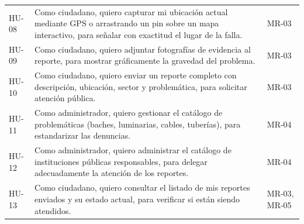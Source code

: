 \begin{table}[!htbp]
\begin{tabularx}{\textwidth}{p{1.2cm} X p{2.5cm}}
		\addlinespace
		HU-08 & Como ciudadano, quiero capturar mi ubicación actual mediante GPS o arrastrando un pin sobre un mapa interactivo, para señalar con exactitud el lugar de la falla. & MR-03 \\ \addlinespace
		HU-09 & Como ciudadano, quiero adjuntar fotografías de evidencia al reporte, para mostrar gráficamente la gravedad del problema. & MR-03 \\ \addlinespace
		HU-10 & Como ciudadano, quiero enviar un reporte completo con descripción, ubicación, sector y problemática, para solicitar atención pública. & MR-03 \\ \addlinespace
		HU-11 & Como administrador, quiero gestionar el catálogo de problemáticas (baches, luminarias, cables, tuberías), para estandarizar las denuncias. & MR-04 \\ \addlinespace
		HU-12 & Como administrador, quiero administrar el catálogo de instituciones públicas responsables, para delegar adecuadamente la atención de los reportes. & MR-04 \\ \addlinespace
		HU-13 & Como ciudadano, quiero consultar el listado de mis reportes enviados y su estado actual, para verificar si están siendo atendidos. & MR-03, MR-05 \\ 
		\bottomrule
	\end{tabularx}
\end{table}

